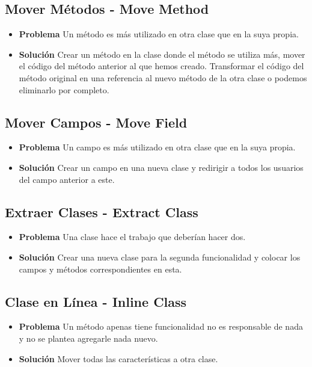 \documentclass[11pt,a4paper,oneside]{book}
\begin{document}
\subsection{Mover Métodos - Move Method}  
\begin{itemize}
    \item \textbf{Problema} Un método es más utilizado en otra clase que en la suya propia.
    \item \textbf{Solución} Crear un método en la clase donde el método se utiliza más, mover el código del método anterior al que hemos creado. Transformar el código del método original en una referencia al nuevo método de la otra clase o podemos eliminarlo por completo.
\end{itemize}
    
\subsection{Mover Campos - Move Field}
\begin{itemize}
    \item \textbf{Problema} Un campo es más utilizado en otra clase que en la suya propia.
    \item \textbf{Solución} Crear un campo en una nueva clase y redirigir a todos los usuarios del campo anterior a este.
\end{itemize}
    
\subsection{Extraer Clases - Extract Class}
\begin{itemize}
    \item \textbf{Problema} Una clase hace el trabajo que deberían hacer dos.
    \item \textbf{Solución} Crear una nueva clase para la segunda funcionalidad y colocar los campos y métodos correspondientes en esta.
\end{itemize}
    
\subsection{Clase en Línea - Inline Class}
\begin{itemize}
    \item \textbf{Problema} Un método apenas tiene funcionalidad no es responsable de nada y no se plantea agregarle nada nuevo.
    \item \textbf{Solución} Mover todas las características a otra clase.
\end{itemize}
    
\end{document}
